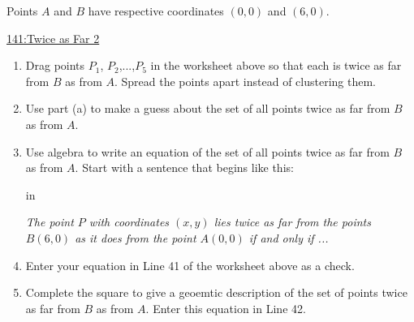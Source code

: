 \documentclass{ximera}
\newcommand{\pskip}{\vskip 0.1 in}
\begin{document}
\begin{question}  \label{Qldf3efr3ezxm}

Points $A$ and $B$ have respective coordinates $(0,0)$ and $(6,0)$.

\begin{onlineOnly}
    \begin{center}
\end{center}
\end{onlineOnly}

\href{https://www.desmos.com/calculator/wwvyilgnv0}{141:Twice as Far 2}

\begin{enumerate}
\item Drag points $P_1$, $P_2$,...,$P_5$ in the worksheet above so that each is twice as far from $B$ as from $A$. Spread the points apart instead of clustering them.

\item Use part (a) to make a guess about the set of all points twice as far from $B$ as from $A$.

\item Use algebra to write an equation of the set of all points twice as far from $B$ as from $A$. Start with a sentence that begins like this:

\pskip

\emph{The point $P$ with coordinates $(x,y)$ lies twice as far from the points $B(6,0)$ as it does from the point $A(0,0)$ if and only if ...}

\item Enter your equation in Line 41 of the worksheet above as a check.

\item Complete the square to give a geoemtic description of the set of points twice as far from $B$ as from $A$. Enter this equation in Line 42.
\end{enumerate}

\end{question}
\end{document}
